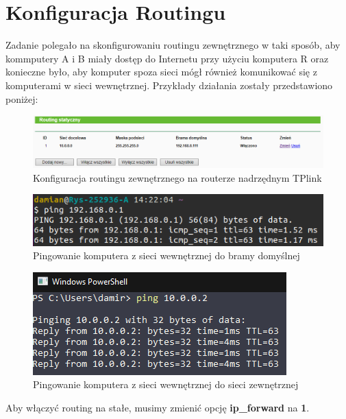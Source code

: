 \documentclass{article}
\begin{document}
\section{Konfiguracja Routingu }
Zadanie polegało na skonfigurowaniu routingu zewnętrznego w taki sposób, aby kommputery A i B miały dostęp do Internetu przy użyciu komputera R oraz konieczne było, aby komputer spoza sieci mógł również komunikować się z komputerami w sieci wewnętrznej. Przykłady działania zostały przedstawiono poniżej:

\begin{figure}[H]
    \centering
    \includegraphics[totalheight=2cm]{2.Routing/opera_J2o0ex77ut.png}  
    \caption{Konfiguracja routingu zewnętrznego na routerze nadrzędnym TPlink}
    \label{2}
\end{figure}

\begin{figure}[H]
    \centering
    \includegraphics[totalheight=2cm]{2.Routing/VirtualBoxVM_n87Icx87hz.png}  
    \caption{Pingowanie komputera z sieci wewnętrznej do bramy domyślnej}
    \label{2}
\end{figure}

\begin{figure}[H]
    \centering
    \includegraphics[totalheight=2cm]{2.Routing/powershell_V3Sz7zP30h.png}  
    \caption{Pingowanie komputera z sieci wewnętrznej do sieci zewnętrznej}
    \label{2}
\end{figure}

Aby włączyć routing na stałe, musimy zmienić opcję \textbf{ip\_forward} na \textbf{1}.
\end{document}
